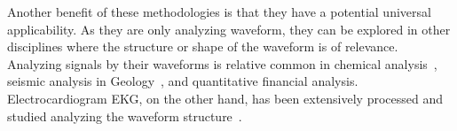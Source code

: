 \documentclass[brainsci,article,submit,moreauthors,pdftex,10pt,a4paper]{mdpi}
\begin{document}

Another benefit of these methodologies is that they have a potential universal applicability.  As they are only analyzing waveform, they can be explored in other disciplines where the structure or shape of the waveform is of relevance.  Analyzing signals by their waveforms is relative common in chemical analysis~\citep{Skoog2000}, seismic analysis in Geology~\citep{Owens1984}, and quantitative financial analysis.  Electrocardiogram EKG, on the other hand, has been extensively processed and studied analyzing the waveform structure~\citep{Stockman1976}.


%
%
%
%



\vspace{6pt} 


\end{document}
